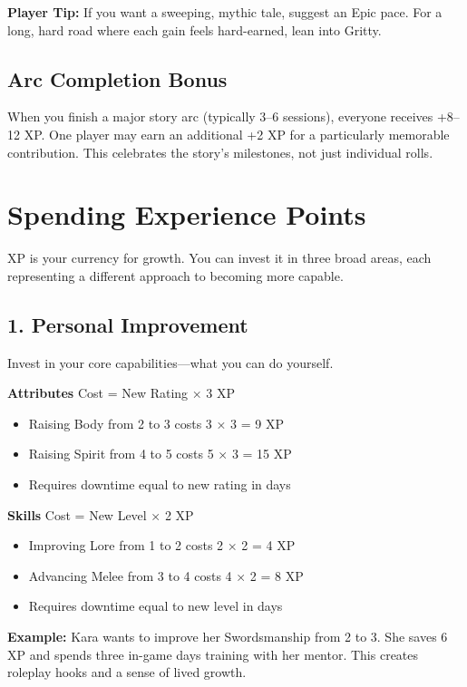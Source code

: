 \documentclass[11pt,twoside,openany]{book}
\begin{document}
\textbf{Player Tip:} If you want a sweeping, mythic tale, suggest an Epic pace. For a long, hard road where each gain feels hard-earned, lean into Gritty.

\subsection*{Arc Completion Bonus}

When you finish a major story arc (typically 3--6 sessions), everyone receives +8--12 XP. One player may earn an additional +2 XP for a particularly memorable contribution. This celebrates the story's milestones, not just individual rolls.

\section*{Spending Experience Points} 

XP is your currency for growth. You can invest it in three broad areas, each representing a different approach to becoming more capable.

\subsection*{1. Personal Improvement}

Invest in your core capabilities---what you can do yourself.

\textbf{Attributes} Cost = New Rating × 3 XP
\begin{itemize}
\item Raising Body from 2 to 3 costs 3 × 3 = 9 XP
\item Raising Spirit from 4 to 5 costs 5 × 3 = 15 XP
\item Requires downtime equal to new rating in days
\end{itemize}

\textbf{Skills} Cost = New Level × 2 XP
\begin{itemize}
\item Improving Lore from 1 to 2 costs 2 × 2 = 4 XP
\item Advancing Melee from 3 to 4 costs 4 × 2 = 8 XP
\item Requires downtime equal to new level in days
\end{itemize}

\textbf{Example:} Kara wants to improve her Swordsmanship from 2 to 3. She saves 6 XP and spends three in-game days training with her mentor. This creates roleplay hooks and a sense of lived growth.
\end{document}

